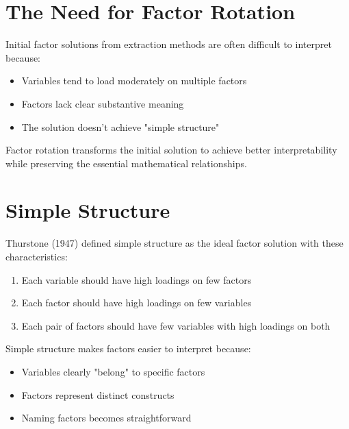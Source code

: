 \documentclass[a4paper]{tufte-book}
\begin{document}
\section{The Need for Factor Rotation}

Initial factor solutions from extraction methods are often difficult to interpret because:

\begin{itemize}
\item Variables tend to load moderately on multiple factors
\item Factors lack clear substantive meaning
\item The solution doesn't achieve "simple structure"
\end{itemize}

Factor rotation transforms the initial solution to achieve better interpretability while preserving the essential mathematical relationships.


\section{Simple Structure}

Thurstone (1947) defined simple structure as the ideal factor solution with these characteristics:

\begin{enumerate}
\item Each variable should have high loadings on few factors
\item Each factor should have high loadings on few variables
\item Each pair of factors should have few variables with high loadings on both
\end{enumerate}

\begin{learningtip}
Simple structure makes factors easier to interpret because:
\begin{itemize}
\item Variables clearly "belong" to specific factors
\item Factors represent distinct constructs
\item Naming factors becomes straightforward
\end{itemize}
\end{learningtip}
\end{document}
